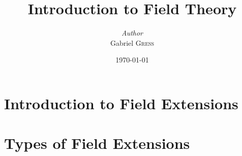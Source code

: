 \documentclass{memoir}
\title{Introduction to Field Theory}
\author{\textit{Author}\\Gabriel \textsc{Gress}}
\date{\today}
\begin{document}


\maketitle



%

\chapter{Introduction to Field Extensions}
\label{cha:introduction_to_field_extensions}






\chapter{Types of Field Extensions}
\label{cha:types_of_field_extensions}



















\end{document}
